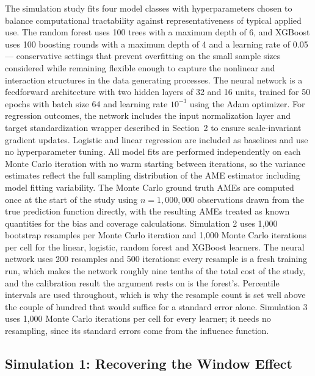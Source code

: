 \documentclass[12pt,a4paper]{article}
\numberwithin{equation}{section}
\theoremstyle{plain}
\theoremstyle{definition}
\begin{document}
	The simulation study fits four model classes with hyperparameters chosen to balance computational tractability against representativeness of typical applied use. The random forest uses 100 trees with a maximum depth of 6, and XGBoost uses 100 boosting rounds with a maximum depth of 4 and a learning rate of 0.05 --- conservative settings that prevent overfitting on the small sample sizes considered while remaining flexible enough to capture the nonlinear and interaction structures in the data generating processes. The neural network is a feedforward architecture with two hidden layers of 32 and 16 units, trained for 50 epochs with batch size 64 and learning rate $10^{-3}$ using the Adam optimizer. For regression outcomes, the network includes the input normalization layer and target standardization wrapper described in Section~2 to ensure scale-invariant gradient updates. Logistic and linear regression are included as baselines and use no hyperparameter tuning. All model fits are performed independently on each Monte Carlo iteration with no warm starting between iterations, so the variance estimates reflect the full sampling distribution of the AME estimator including model fitting variability. The Monte Carlo ground truth AMEs are computed once at the start of the study using $n=1{,}000{,}000$ observations drawn from the true prediction function directly, with the resulting AMEs treated as known quantities for the bias and coverage calculations. Simulation 2 uses 1{,}000 bootstrap resamples per Monte Carlo iteration and 1{,}000 Monte Carlo iterations per cell for the linear, logistic, random forest and XGBoost learners. The neural network uses 200 resamples and 500 iterations: every resample is a fresh training run, which makes the network roughly nine tenths of the total cost of the study, and the calibration result the argument rests on is the forest's. Percentile intervals are used throughout, which is why the resample count is set well above the couple of hundred that would suffice for a standard error alone. Simulation 3 uses 1{,}000 Monte Carlo iterations per cell for every learner; it needs no resampling, since its standard errors come from the influence function.


	\subsection{Simulation 1: Recovering the Window Effect}
	
\end{document}
